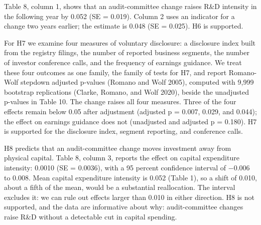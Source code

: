 \documentclass[12pt]{article}
\begin{document}
Table 8, column 1, shows that an audit-committee change raises R\&D intensity in the following year by 0.052 (SE = 0.019). Column 2 uses an indicator for a change two years earlier; the estimate is 0.048 (SE = 0.025). H6 is supported.

For H7 we examine four measures of voluntary disclosure: a disclosure index built from the registry filings, the number of reported business segments, the number of investor conference calls, and the frequency of earnings guidance. We treat these four outcomes as one family, the family of tests for H7, and report Romano-Wolf stepdown adjusted p-values (Romano and Wolf 2005), computed with 9,999 bootstrap replications (Clarke, Romano, and Wolf 2020), beside the unadjusted p-values in Table 10. The change raises all four measures. Three of the four effects remain below 0.05 after adjustment (adjusted p = 0.007, 0.029, and 0.044); the effect on earnings guidance does not (unadjusted and adjusted p = 0.180). H7 is supported for the disclosure index, segment reporting, and conference calls.

H8 predicts that an audit-committee change moves investment away from physical capital. Table 8, column 3, reports the effect on capital expenditure intensity: 0.0010 (SE = 0.0036), with a 95 percent confidence interval of $-$0.006 to 0.008. Mean capital expenditure intensity is 0.052 (Table 1), so a shift of 0.010, about a fifth of the mean, would be a substantial reallocation. The interval excludes it: we can rule out effects larger than 0.010 in either direction. H8 is not supported, and the data are informative about why: audit-committee changes raise R\&D without a detectable cut in capital spending.
\end{document}
